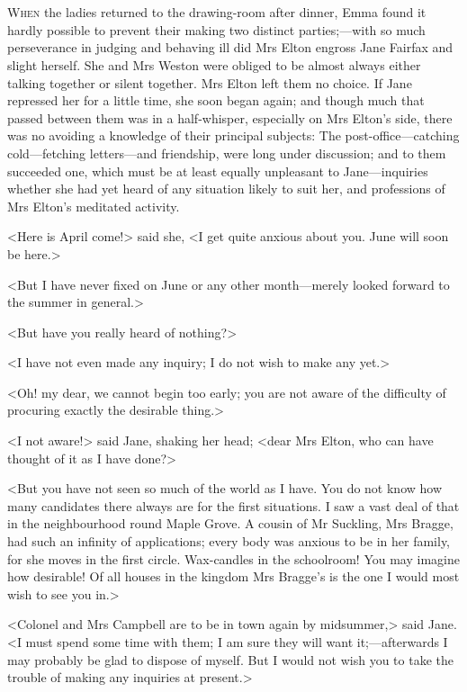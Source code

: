 \chapter[Chapter \thechapter]{}
\lettrine[lraise=0.35]{W}{hen} the ladies returned to the drawing-room after dinner, Emma found it hardly possible to prevent their making two distinct parties;—with so much perseverance in judging and behaving ill did Mrs Elton engross Jane Fairfax and slight herself. She and Mrs Weston were obliged to be almost always either talking together or silent together. Mrs Elton left them no choice. If Jane repressed her for a little time, she soon began again; and though much that passed between them was in a half-whisper, especially on Mrs Elton's side, there was no avoiding a knowledge of their principal subjects: The post-office—catching cold—fetching letters—and friendship, were long under discussion; and to them succeeded one, which must be at least equally unpleasant to Jane—inquiries whether she had yet heard of any situation likely to suit her, and professions of Mrs Elton's meditated activity.

<Here is April come!> said she, <I get quite anxious about you. June will soon be here.>

<But I have never fixed on June or any other month—merely looked forward to the summer in general.>

<But have you really heard of nothing?>

<I have not even made any inquiry; I do not wish to make any yet.>

<Oh! my dear, we cannot begin too early; you are not aware of the difficulty of procuring exactly the desirable thing.>

<I not aware!> said Jane, shaking her head; <dear Mrs Elton, who can have thought of it as I have done?>

<But you have not seen so much of the world as I have. You do not know how many candidates there always are for the first situations. I saw a vast deal of that in the neighbourhood round Maple Grove. A cousin of Mr Suckling, Mrs Bragge, had such an infinity of applications; every body was anxious to be in her family, for she moves in the first circle. Wax-candles in the schoolroom! You may imagine how desirable! Of all houses in the kingdom Mrs Bragge's is the one I would most wish to see you in.>

<Colonel and Mrs Campbell are to be in town again by midsummer,> said Jane. <I must spend some time with them; I am sure they will want it;—afterwards I may probably be glad to dispose of myself. But I would not wish you to take the trouble of making any inquiries at present.>

